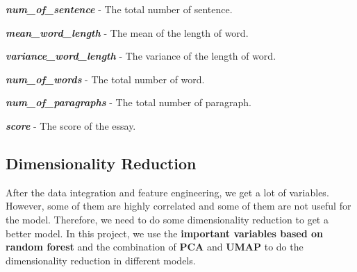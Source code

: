 \documentclass[8pt]{article}
\begin{document}
{\begin{compactitem}
    \item \textbf{\textit{num\_of\_sentence}} - The total number of sentence.
    \item \textbf{\textit{mean\_word\_length}} - The mean of the length of word.
    \item \textbf{\textit{variance\_word\_length}} - The variance of the length of word.
    \item \textbf{\textit{num\_of\_words}} - The total number of word.
    \item \textbf{\textit{num\_of\_paragraphs}} - The total number of paragraph.
    \item \textbf{\textit{score}} - The score of the essay.
\end{compactitem}
}

\subsection{Dimensionality Reduction}
After the data integration and feature engineering, we get a lot of variables.
However, some of them are highly correlated and some of them are not useful for the model.
Therefore, we need to do some dimensionality reduction to get a better model.
In this project, we use the \textbf{important variables based on random forest} and the combination of \textbf{PCA} and \textbf{UMAP} to do the dimensionality reduction in different models.
\end{document}
